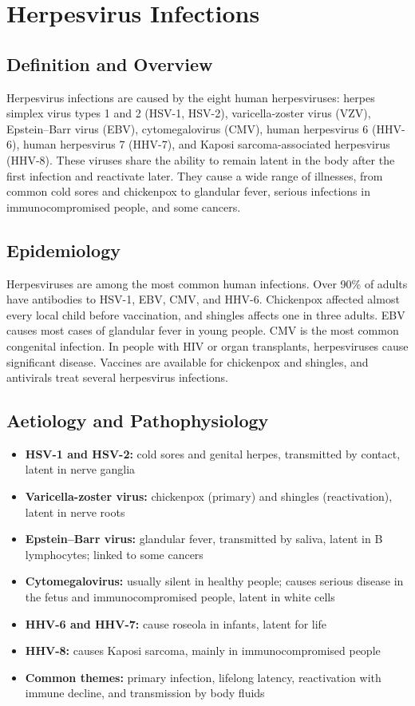 \chapter{Herpesvirus Infections}

\section*{Definition and Overview}
Herpesvirus infections are caused by the eight human herpesviruses: herpes simplex virus types 1 and 2 (HSV-1, HSV-2), varicella-zoster virus (VZV), Epstein--Barr virus (EBV), cytomegalovirus (CMV), human herpesvirus 6 (HHV-6), human herpesvirus 7 (HHV-7), and Kaposi sarcoma-associated herpesvirus (HHV-8). These viruses share the ability to remain latent in the body after the first infection and reactivate later. They cause a wide range of illnesses, from common cold sores and chickenpox to glandular fever, serious infections in immunocompromised people, and some cancers.

\section*{Epidemiology}
Herpesviruses are among the most common human infections. Over 90\% of adults have antibodies to HSV-1, EBV, CMV, and HHV-6. Chickenpox affected almost every local child before vaccination, and shingles affects one in three adults. EBV causes most cases of glandular fever in young people. CMV is the most common congenital infection. In people with HIV or organ transplants, herpesviruses cause significant disease. Vaccines are available for chickenpox and shingles, and antivirals treat several herpesvirus infections.

\section*{Aetiology and Pathophysiology}
\begin{itemize}
    \item \textbf{HSV-1 and HSV-2:} cold sores and genital herpes, transmitted by contact, latent in nerve ganglia
    \item \textbf{Varicella-zoster virus:} chickenpox (primary) and shingles (reactivation), latent in nerve roots
    \item \textbf{Epstein--Barr virus:} glandular fever, transmitted by saliva, latent in B lymphocytes; linked to some cancers
    \item \textbf{Cytomegalovirus:} usually silent in healthy people; causes serious disease in the fetus and immunocompromised people, latent in white cells
    \item \textbf{HHV-6 and HHV-7:} cause roseola in infants, latent for life
    \item \textbf{HHV-8:} causes Kaposi sarcoma, mainly in immunocompromised people
    \item \textbf{Common themes:} primary infection, lifelong latency, reactivation with immune decline, and transmission by body fluids
\end{itemize}

